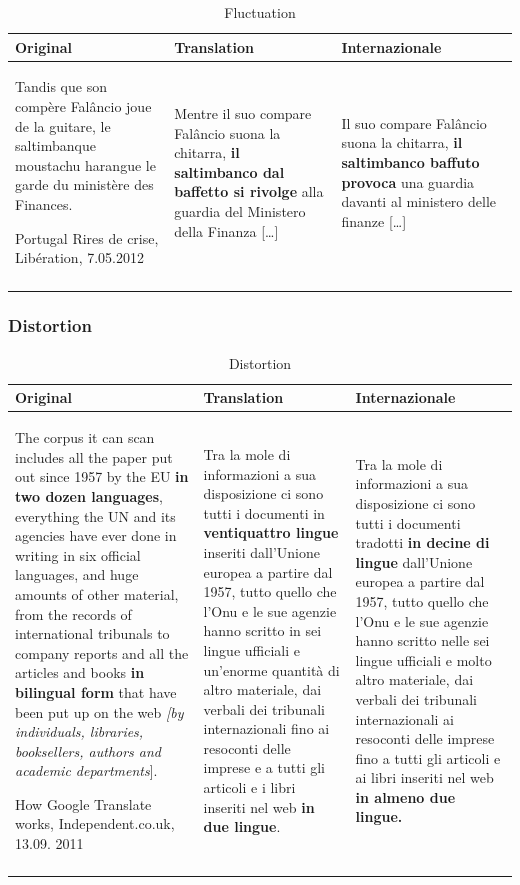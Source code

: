 \documentclass[output=paper]{LSP/langsci}
\begin{document}
%
\begin{table}
 \tiny
 \caption{Fluctuation}
 \label{troqe-marchan:tab:6}
\begin{tabularx}{\textwidth}{XXX}
\lsptoprule
 Original &  Translation & Internazionale\\
 \midrule
 Tandis que son compère Falâncio joue de la guitare, le saltimbanque moustachu harangue le garde du ministère des Finances. 

 Portugal Rires de crise, Libération, 7.05.2012 &  Mentre il suo compare Falâncio suona la chitarra, \textbf{il saltimbanco dal baffetto si rivolge} alla guardia del Ministero della Finanza [\ldots] &  Il suo compare Falâncio suona la chitarra, \textbf{il saltimbanco baffuto provoca} una guardia davanti al ministero delle finanze [\ldots ] \\
\lspbottomrule
\end{tabularx}
\end{table}

\subsubsection{Distortion}

 
\begin{table}[b]
 \tiny
 \caption{Distortion}
 \label{troqe-marchan:tab:7}
\begin{tabularx}{\textwidth}{XXX}
\lsptoprule
  Original & Translation & Internazionale\\
  \midrule
The corpus it can scan includes all the paper put out since 1957 by the EU \textbf{in two dozen languages}, everything the UN and its agencies have ever done in writing in six official languages, and huge amounts of other material, from the records of international tribunals to company reports and all the articles and books \textbf{in bilingual form} that have been put up on the web \textit{[by individuals, libraries, booksellers, authors and academic departments}].

 How Google Translate works, Independent.co.uk, 13.09. 2011 &  Tra la mole di informazioni a sua disposizione ci sono tutti i documenti in \textbf{ventiquattro lingue} inseriti dall'Unione europea a partire dal 1957, tutto quello che l'Onu e le sue agenzie hanno scritto in sei lingue ufficiali e un'enorme quantità di altro materiale, dai verbali dei tribunali internazionali fino ai resoconti delle imprese e a tutti gli articoli e i libri inseriti nel web \textbf{in due lingue}. & Tra la mole di informazioni a sua disposizione ci sono tutti i documenti tradotti \textbf{in decine di lingue} dall'Unione europea a partire dal 1957, tutto quello che l'Onu e le sue agenzie hanno scritto nelle sei lingue ufficiali e molto altro materiale, dai verbali dei tribunali internazionali ai resoconti delle imprese fino a tutti gli articoli e ai libri inseriti nel web \textbf{in almeno due lingue.}\\
\lspbottomrule
\end{tabularx}
\end{table}
\end{document}
